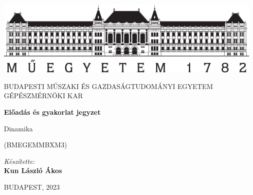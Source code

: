 \documentclass[12pt,a4paper]{article}
\begin{document}
\begin{titlepage}
\centering

\includegraphics[width=.8\textwidth]{bme_logo_nagy.jpg}

\vspace{1em}

{
\large
BUDAPESTI MŰSZAKI ÉS GAZDASÁGTUDOMÁNYI EGYETEM GÉPÉSZMÉRNÖKI KAR
}

\vspace{8em}

{
\Huge
\textbf{Előadás és gyakorlat jegyzet}
}

\vspace{10em}

{
\huge
Dinamika

\vspace{.2em}

\large
(BMEGEMMBXM3)
}

\vspace{4em}

{
\Large
\textit{Készítette:}\\
\vspace{.5em}
\textbf{Kun László Ákos}
}

\vspace{16em}

{
\large
BUDAPEST, 2023
}
\end{titlepage}


\end{document}
